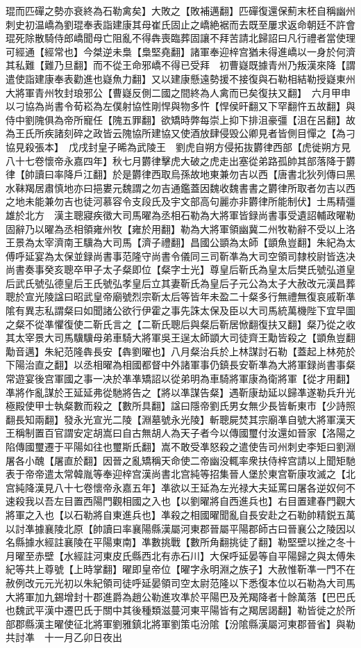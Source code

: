 琨而匹磾之勢亦衰終為石勒禽矣】大敗之【敗補邁翻】匹磾復還保薊末柸自稱幽州刺史初温嶠為劉琨奉表詣建康其母崔氏固止之嶠絶裾而去既至屢求返命朝廷不許會琨死除散騎侍郎嶠聞母亡阻亂不得犇喪臨葬固讓不拜苦請北歸詔曰凡行禮者當使理可經通【經常也】今桀逆未梟【梟堅堯翻】諸軍奉迎梓宫猶未得進嶠以一身於何濟其私難【難乃旦翻】而不從王命邪嶠不得已受拜　初曹嶷既據青州乃叛漢來降【謂遣使詣建康奉表勸進也嶷魚力翻】又以建康懸遠勢援不接復與石勒相結勒授嶷東州大將軍青州牧封琅邪公【曹嶷反側二國之間終為人禽而已矣復扶又翻】　六月甲申以刁協為尚書令荀崧為左僕射協性剛悍與物多忤【悍侯旰翻又下罕翻忤五故翻】與侍中劉隗俱為帝所寵任【隗五罪翻】欲矯時弊每崇上抑下排沮豪彊【沮在呂翻】故為王氏所疾諸刻碎之政皆云隗協所建協又使酒放肆侵毁公卿見者皆側目憚之【為刁協見殺張本】　戊戌封皇子晞為武陵王　劉虎自朔方侵拓抜欝律西部【虎徙朔方見八十七卷懷帝永嘉四年】秋七月欝律擊虎大破之虎走出塞從弟路孤帥其部落降于欝律【帥讀曰率降戶江翻】於是欝律西取烏孫故地東兼勿吉以西【唐書北狄列傳曰黑水靺羯居肅慎地亦曰挹婁元魏謂之勿吉通鑑蓋因魏收魏書書之欝律所取者勿吉以西之地未能兼勿吉也徒河慕容令支段氏及宇文部高句麗亦非欝律所能制伏】士馬精彊雄於北方　漢主聰寢疾徵大司馬曜為丞相石勒為大將軍皆録尚書事受遺詔輔政曜勒固辭乃以曜為丞相領雍州牧【雍於用翻】勒為大將軍領幽冀二州牧勒辭不受以上洛王景為太宰濟南王驥為大司馬【濟子禮翻】昌國公顗為太師【顗魚豈翻】朱紀為太傅呼延宴為太保並録尚書事范隆守尚書令儀同三司靳凖為大司空領司隸校尉皆迭决尚書奏事癸亥聰卒甲子太子粲即位【粲字士光】尊皇后靳氏為皇太后樊氏號弘道皇后武氏號弘德皇后王氏號弘孝皇后立其妻靳氏為皇后子元公為太子大赦改元漢昌葬聰於宣光陵諡曰昭武皇帝廟號烈宗靳太后等皆年未盈二十粲多行無禮無復哀戚靳凖隂有異志私謂粲曰如聞諸公欲行伊霍之事先誅太保及臣以大司馬統萬機陛下宜早圖之粲不從凖懼復使二靳氏言之【二靳氏聰后與粲后靳居惞翻復扶又翻】粲乃從之收其太宰景大司馬驥驥母弟車騎大將軍吳王逞太師顗大司徒齊王勱皆殺之【顗魚豈翻勱音邁】朱紀范隆犇長安【犇劉曜也】八月粲治兵於上林謀討石勒【蓋起上林苑於下陽治直之翻】以丞相曜為相國都督中外諸軍事仍鎮長安靳凖為大將軍録尚書事粲常遊宴後宫軍國之事一决於凖凖矯詔以從弟明為車騎將軍康為衛將軍【從才用翻】凖將作亂謀於王延延弗從馳將告之【將以凖謀告粲】遇靳康劫延以歸凖遂勒兵升光極殿使甲士執粲數而殺之【數所具翻】諡曰隱帝劉氏男女無少長皆斬東市【少詩照翻長知兩翻】發永光宣光二陵【淵墓號永光陵】斬聰屍焚其宗廟凖自號大將軍漢天王稱制置百官謂安定胡嵩曰自古無胡人為天子者今以傳國璽付汝還如晉家【洛陽之陷傳國璽遷于平陽如往也璽斯氏翻】嵩不敢受凖怒殺之遣使告司州刺史李矩曰劉淵屠各小醜【屠直於翻】因晉之亂矯稱天命使二帝幽没輒率衆扶侍梓宫請以上聞矩馳表于帝帝遣太常韓胤等奉迎梓宫漢尚書北宫純等招集晉人堡於東宫靳康攻滅之【北宫純降漢見八十七卷懷帝永嘉五年】凖欲以王延為左光禄大夫延罵曰屠各逆奴何不速殺我以吾左目置西陽門觀相國之入也【以劉曜將自西進兵也】右目置建春門觀大將軍之入也【以石勒將自東進兵也】凖殺之相國曜聞亂自長安赴之石勒帥精鋭五萬以討凖據襄陵北原【帥讀曰率襄陽縣漢屬河東郡晉屬平陽郡師古曰晉襄公之陵因以名縣據水經註襄陵在平陽東南】凖數挑戰【數所角翻挑徒了翻】勒堅壁以挫之冬十月曜至赤壁【水經註河東皮氏縣西北有赤石川】大保呼延晏等自平陽歸之與太傅朱紀等共上尊號【上時掌翻】曜即皇帝位【曜字永明淵之族子】大赦惟靳凖一門不在赦例改元元光初以朱紀領司徒呼延晏領司空太尉范隆以下悉復本位以石勒為大司馬大將軍加九錫增封十郡進爵為趙公勒進攻凖於平陽巴及羌羯降者十餘萬落【巴巴氏也魏武平漢中遷巴氏于關中其後種類滋蔓河東平陽皆有之羯居謁翻】勒皆徙之於所部郡縣漢主曜使征北將軍劉雅鎮北將軍劉策屯汾隂【汾隂縣漢屬河東郡晉省】與勒共討凖　十一月乙卯日夜出